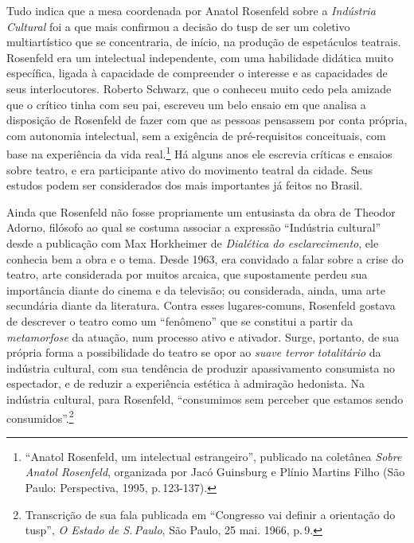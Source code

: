 Tudo indica que a mesa coordenada por Anatol Rosenfeld sobre a
{\it Indústria Cultural} foi a que mais confirmou a decisão do {\sc tusp} de
ser um coletivo multiartístico que se concentraria, de início, na
produção de espetáculos teatrais. Rosenfeld era um intelectual
independente, com uma habilidade didática muito específica, ligada à
capacidade de compreender o interesse e as capacidades de seus
interlocutores. Roberto Schwarz, que o conheceu muito cedo pela amizade
que o crítico tinha com seu pai, escreveu um belo ensaio em que analisa
a disposição de Rosenfeld de fazer com que as pessoas pensassem por conta
própria, com autonomia intelectual, sem a exigência de pré-requisitos
conceituais, com base na experiência da vida real.\footnote{“Anatol
  Rosenfeld, um intelectual estrangeiro”, publicado na coletânea
  {\it Sobre Anatol Rosenfeld}, organizada por Jacó Guinsburg e Plínio Martins Filho (São Paulo: Perspectiva, 1995, p.\,123-137).} Há
alguns anos ele escrevia críticas e ensaios sobre teatro, e era
participante ativo do movimento teatral da cidade. Seus estudos podem
ser considerados dos mais importantes já feitos no Brasil.

Ainda que Rosenfeld não fosse propriamente um entusiasta da obra de
Theodor Adorno, filósofo ao qual se costuma associar a expressão
“Indústria cultural” desde a publicação com Max Horkheimer de {\it Dialética do
esclarecimento}, ele
conhecia bem a obra e o tema. Desde 1963, era convidado a falar
sobre a crise do teatro, arte considerada por muitos arcaica, que
supostamente perdeu sua importância diante do cinema e da televisão; ou
considerada, ainda, uma arte secundária diante da literatura. Contra
esses lugares-comuns, Rosenfeld gostava de descrever o teatro como um
“fenômeno” que se constitui a partir da {\it metamorfose} da atuação,
num processo ativo e ativador. Surge, portanto, de sua própria forma a
possibilidade do teatro se opor ao {\it suave terror totalitário} da
indústria cultural, com sua tendência de produzir apassivamento
consumista no espectador, e de reduzir a experiência estética à
admiração hedonista. Na indústria cultural, para Rosenfeld, “consumimos
sem perceber que estamos sendo consumidos”.\footnote{Transcrição de sua fala publicada em “Congresso vai definir a orientação do {\sc tusp}”, {\it O
  Estado de S.\,Paulo}, São Paulo, 25 mai. 1966, p.\,9.}

